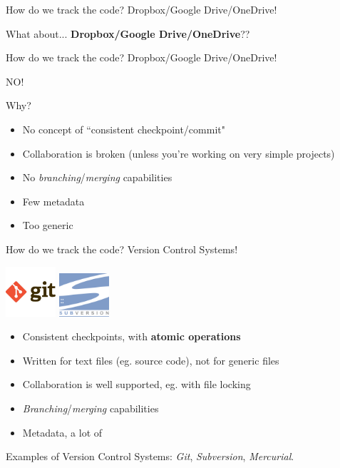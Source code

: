 \begin{frame}[fragile]{How do we track the code? Dropbox/Google Drive/OneDrive!}

What about... \textbf{Dropbox/Google Drive/OneDrive}??

\end{frame}

\begin{frame}[fragile]{How do we track the code? Dropbox/Google Drive/OneDrive!}

\begin{center}
\Huge NO!
\end{center}

\normalsize
Why?
\begin{itemize}
  \item No concept of ``consistent checkpoint/commit"
  \item Collaboration is broken (unless you're working on very simple projects)
  \item No \textit{branching}/\textit{merging} capabilities
  \item Few metadata
  \item Too generic
\end{itemize}

\end{frame}

\begin{frame}[fragile]{How do we track the code? Version Control Systems!}

\begin{center}
\includegraphics[width=5em]{git-logo}
\hspace{10em}
\includegraphics[width=5em]{subversion-logo}
\end{center}

\begin{itemize}
  \item Consistent checkpoints, with \textbf{atomic operations}
  \item Written for text files (eg. source code), not for generic files
  \item Collaboration is well supported, eg. with file locking
  \item \textit{Branching}/\textit{merging} capabilities
  \item Metadata, a lot of
\end{itemize}

Examples of Version Control Systems: \textit{Git}, \textit{Subversion},
\textit{Mercurial}.

\end{frame}


